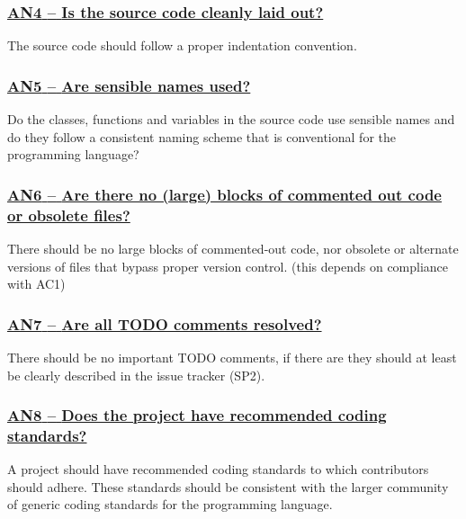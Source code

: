 \documentclass[a4paper,11pt]{article}
\newcommand{\indicator}[1]{\subsubsection*{\underline{#1}}}
\begin{document}
\newcommand{\anFourName}{AN4}
\newcommand{\anFourID}{\anFourName}
\newcommand{\anFourText}{Is the source code cleanly laid out?}
\indicator{\anFourName{ }--{ }\anFourText}\label{id:an4} 

The source code should follow a proper indentation convention. 

\newcommand{\anFiveName}{AN5}
\newcommand{\anFiveID}{\anFiveName}
\newcommand{\anFiveText}{Are sensible names used?}
\indicator{\anFiveName{ }--{ }\anFiveText}\label{id:an5} 

Do the classes, functions and variables in the source code use sensible names
and do they follow a consistent naming scheme that is conventional for the
programming language?

\newcommand{\anSixName}{AN6}
\newcommand{\anSixID}{\anSixName}
\newcommand{\anSixText}{Are there no (large) blocks of commented out code or obsolete files?}
\indicator{\anSixName{ }--{ }\anSixText}\label{id:an6} 

There should be no large blocks of commented-out code, nor obsolete or
alternate versions of files that bypass proper version control.
(this depends on compliance with AC1)

\newcommand{\anSevenName}{AN7}
\newcommand{\anSevenID}{\anSevenName}
\newcommand{\anSevenText}{Are all TODO comments resolved?}
\indicator{\anSevenName{ }--{ }\anSevenText}\label{id:an7} 

There should be no important TODO comments, if there are they should at least be
clearly described in the issue tracker (SP2).

\newcommand{\anEightName}{AN8}
\newcommand{\anEightID}{\anEightName}
\newcommand{\anEightText}{Does the project have recommended coding standards?}
\indicator{\anEightName{ }--{ }\anEightText}\label{id:an8} 

A project should have recommended coding standards to which contributors
should adhere. These standards should be consistent with the larger community
of generic coding standards for the programming language.
\end{document}
